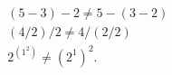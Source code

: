 \documentclass[12pt]{article}
\begin{document}
$$
{\begin{matrix}(5-3)-2\neq 5-(3-2)\quad \\(4/2)/2\neq 4/(2/2)\qquad \qquad \\2^{{(1^{2})}}\neq (2^{1})^{2}.\quad \qquad \qquad \end{matrix}}
$$
\end{document}
